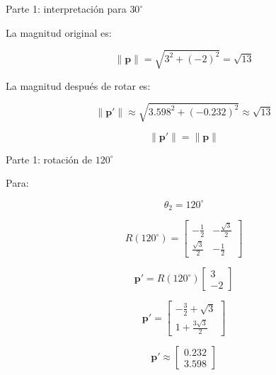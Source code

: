 \documentclass[aspectratio=169]{beamer}
\begin{document}
\begin{frame}{Parte 1: interpretación para \texorpdfstring{$30^\circ$}{30 grados}}

    La magnitud original es:

    \[
    \|\mathbf{p}\|
    =
    \sqrt{3^2+(-2)^2}
    =
    \sqrt{13}
    \]

    La magnitud después de rotar es:

    \[
    \|\mathbf{p}'\|
    \approx
    \sqrt{3.598^2+(-0.232)^2}
    \approx
    \sqrt{13}
    \]

    \[
    \boxed{
        \|\mathbf{p}'\|=\|\mathbf{p}\|
    }
    \]

    \vspace{0.3cm}


\end{frame}

\begin{frame}{Parte 1: rotación de \texorpdfstring{$120^\circ$}{120 grados}}

    Para:

    \[
    \theta_2=120^\circ
    \]

    \[
    R(120^\circ)
    =
    \begin{bmatrix}
        -\frac{1}{2} & -\frac{\sqrt{3}}{2}\\
        \frac{\sqrt{3}}{2} & -\frac{1}{2}
    \end{bmatrix}
    \]

    \[
    \mathbf{p}'
    =
    R(120^\circ)
    \begin{bmatrix}
        3\\
        -2
    \end{bmatrix}
    \]

    \[
    \mathbf{p}'
    =
    \begin{bmatrix}
        -\frac{3}{2}+\sqrt{3}\\
        1+\frac{3\sqrt{3}}{2}
    \end{bmatrix}
    \]

    \[
    \boxed{
        \mathbf{p}'
        \approx
        \begin{bmatrix}
            0.232\\
            3.598
    \end{bmatrix}}
    \]

\end{frame}
\end{document}
